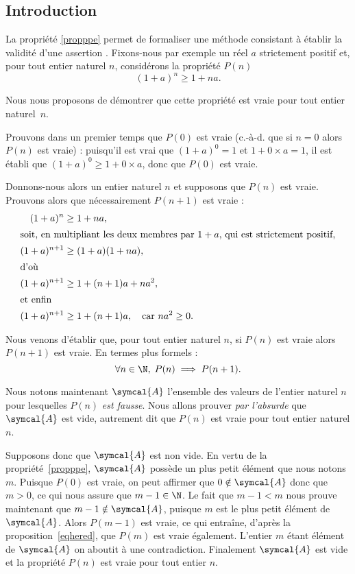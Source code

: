 \subsection{Introduction}
\label{secexplerec}
La propriété \ref{propppe} permet de formaliser une méthode consistant à établir la validité d'une assertion . Fixons-nous par exemple un réel $a$ strictement positif et, pour tout entier naturel $n$, considérons la propriété $P(n)$
\[(1+a)^n\geq 1+na.\]

Nous nous proposons de démontrer que cette propriété est vraie pour tout entier naturel~$n$.

Prouvons dans un premier temps que $P(0)$ est vraie (\mbox{c.-à-d.} que si $n=0$ alors $P(n)$ est vraie) : puisqu'il est vrai que $(1+a)^0=1$ et $1+0\times a=1$, il est établi que $(1+a)^0\geq1+0\times a$, donc que $P(0)$ est vraie.

Donnons-nous alors un entier naturel $n$ et supposons que $P(n)$ est vraie. Prouvons alors que nécessairement $P(n+1)$ est vraie :
\begin{align*}
(1+a)^n&\geq1+na,\\
\intertext{soit, en multipliant les deux membres par $1+a$, qui est strictement positif,}
(1+a)^{n+1}&\geq(1+a)(1+na),\\
\intertext{d'où}
(1+a)^{n+1}&\geq 1+(n+1)a+na^2,\\
\intertext{et enfin}
(1+a)^{n+1}&\geq 1+(n+1)a,\quad \text{car $na^2\geq0$.}
\end{align*}

Nous venons d'établir que, pour tout entier naturel $n$, si $P(n)$ est vraie alors $P(n+1)$ est vraie. En termes plus formels :
\begin{equation}
\forall n\in\N,\; P(n)\implies P(n+1).
\label{eqhered}
\end{equation}

Nous notons maintenant $\symcal{A}$ l'ensemble des valeurs de l'entier naturel $n$ pour lesquelles $P(n)$ \emph{est fausse}. Nous allons prouver \emph{par l'absurde} que $\symcal{A}$ est vide, autrement dit que $P(n)$ est vraie pour tout entier naturel $n$. 

Supposons donc que $\symcal{A}$ est non vide. En vertu de la propriété \ref{propppe}, $\symcal{A}$ possède un plus petit élément que nous notons $m$. Puisque $P(0)$ est vraie, on peut affirmer que $0\notin\symcal{A}$ donc que $m>0$, ce qui nous assure que $m-1\in\N$. Le fait que $m-1<m$ nous prouve maintenant que $m-1\notin\symcal{A}$, puisque $m$ est le plus petit élément de $\symcal{A}$. Alors $P(m-1)$ est vraie, ce qui entraîne, d'après la proposition \eqref{eqhered}, que $P(m)$ est vraie également. L'entier $m$ étant élément de $\symcal{A}$ on aboutit à une contradiction. Finalement $\symcal{A}$ est vide et la propriété $P(n)$ est vraie pour tout entier $n$.


